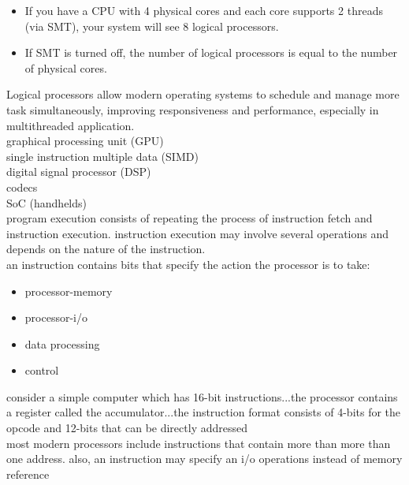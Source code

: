 \documentclass{article}
\begin{document}
	\begin{itemize}
		\item If you have a CPU with 4 physical cores and each core supports 2 threads (via SMT), your system will see 8 logical processors.
		\item If SMT is turned off, the number of logical processors is equal to the number of physical cores.
	\end{itemize}
	Logical processors allow modern operating systems to schedule and manage more task simultaneously, improving responsiveness and performance, especially in multithreaded application.\\


graphical processing unit (GPU)\\



single instruction multiple data (SIMD)\\



digital signal processor (DSP)\\



codecs\\


SoC (handhelds)\\

program execution consists of repeating the process of instruction fetch and instruction execution. instruction execution may involve several operations and depends on the nature of the instruction.\\

an instruction contains bits that specify the action the processor is to take:
	\begin{itemize}
		\item processor-memory
		\item processor-i/o
		\item data processing
		\item control
	\end{itemize}

consider a simple computer which has 16-bit instructions...the processor contains a register called the accumulator...the instruction format consists of 4-bits for the opcode and 12-bits that can be directly addressed\\

most modern processors include instructions that contain more than more than one address. also, an instruction may specify an i/o operations instead of memory reference\\
\end{document}

